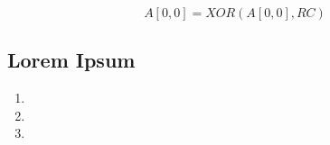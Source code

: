 \begin{equation}
  \label{eq:iota}
  A[0,0]=XOR(A[0,0], RC)
\end{equation}



\subsection{Lorem Ipsum}
\label{subsec:loremipsum}

\lipsum[11]


\lipsum[12]

\begin{enumerate}
  \item \lipsum[13][1-4]
  \item \lipsum[13][5-8]
  \item \lipsum[13][9-12]
\end{enumerate}

\lipsum[14-15]
